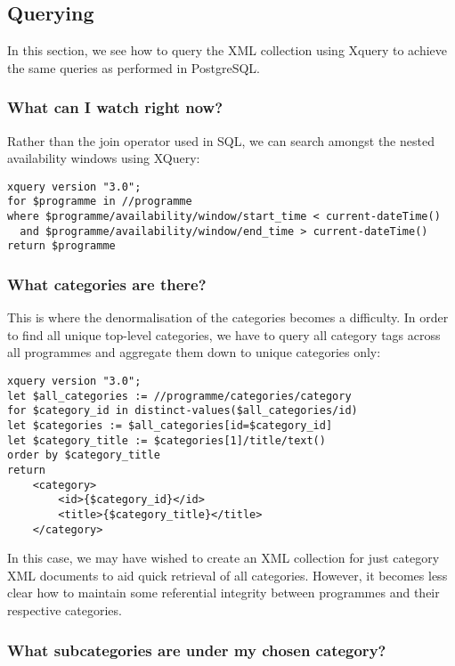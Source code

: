 \documentclass[11pt,a4paper]{article}
\begin{document}
\subsection{Querying}

In this section, we see how to query the XML collection using Xquery to
achieve the same queries as performed in PostgreSQL.

\subsubsection{What can I watch right now?}

Rather than the join operator used in SQL, we can search amongst
the nested availability windows using XQuery:

\begin{lstlisting}
xquery version "3.0";
for $programme in //programme
where $programme/availability/window/start_time < current-dateTime()
  and $programme/availability/window/end_time > current-dateTime()
return $programme
\end{lstlisting}

\subsubsection{What categories are there?}

This is where the denormalisation of the categories becomes a difficulty.
In order to find all unique top-level categories, we have to query all
category tags across all programmes and aggregate them down to unique
categories only:

\begin{lstlisting}
xquery version "3.0";
let $all_categories := //programme/categories/category
for $category_id in distinct-values($all_categories/id)
let $categories := $all_categories[id=$category_id]
let $category_title := $categories[1]/title/text()
order by $category_title
return 
    <category>
        <id>{$category_id}</id>
        <title>{$category_title}</title>
    </category>
\end{lstlisting}

In this case, we may have wished to create an XML collection for just
category XML documents to aid quick retrieval of all categories. However,
it becomes less clear how to maintain some referential integrity
between programmes and their respective categories.

\subsubsection{What subcategories are under my chosen category?}
\end{document}

